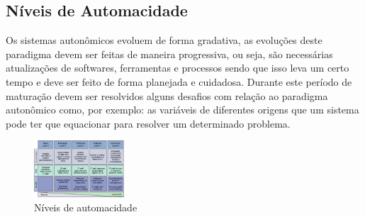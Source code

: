 \documentclass[11pt,twoside]{article}
\begin{document}
\subsection{Níveis de Automacidade}
Os sistemas autonômicos evoluem de forma gradativa, as evoluções deste paradigma devem ser feitas de maneira progressiva, ou seja, são necessárias atualizações de softwares, ferramentas e processos sendo que isso leva um certo tempo e deve ser feito de forma planejada e cuidadosa. Durante este período de maturação devem ser resolvidos alguns desafios com relação ao paradigma autonômico como, por exemplo: as variáveis de diferentes origens que um sistema pode ter que equacionar para resolver um determinado problema. 

\begin{figure}
    \centering
    \includegraphics[width=0.3\textwidth]{Picture2.png}
    \centering
    \caption{Níveis de automacidade}
    \label{Sec:Intro:Fig1}
\end{figure}
\end{document}
